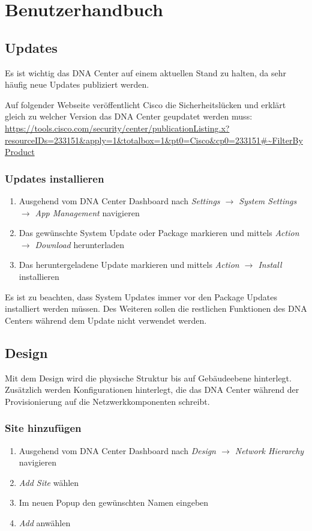 \section{Benutzerhandbuch}

\subsection{Updates}
Es ist wichtig das DNA Center auf einem aktuellen Stand zu halten, da sehr häufig neue Updates publiziert werden.

Auf folgender Webseite veröffentlicht Cisco die Sicherheitslücken und erklärt gleich zu welcher Version das DNA Center geupdatet werden muss:
\url{https://tools.cisco.com/security/center/publicationListing.x?resourceIDs=233151\&apply=1\&totalbox=1\&pt0=Cisco\&cp0=233151\#~FilterByProduct}

\subsubsection{Updates installieren}
\begin{enumerate}
	\item Ausgehend vom DNA Center Dashboard nach \textit{Settings $\rightarrow$ System Settings $\rightarrow$ App Management} navigieren
	\item Das gewünschte System Update oder Package markieren und mittels \textit{Action $\rightarrow$ Download} herunterladen
	\item Das heruntergeladene Update markieren und mittels \textit{Action $\rightarrow$ Install} installieren
\end{enumerate}

Es ist zu beachten, dass System Updates immer vor den Package Updates installiert werden müssen. Des Weiteren sollen die restlichen Funktionen des DNA Centers während dem Update nicht verwendet werden.

\subsection{Design}
Mit dem Design wird die physische Struktur bis auf Gebäudeebene hinterlegt. Zusätzlich werden Konfigurationen hinterlegt, die das DNA Center während der Provisionierung auf die Netzwerkkomponenten schreibt.

\subsubsection{Site hinzufügen}
\begin{enumerate}
	\item Ausgehend vom DNA Center Dashboard nach \textit{Design $\rightarrow$ Network Hierarchy} navigieren
	\item \textit{Add Site} wählen
	\item Im neuen Popup den gewünschten Namen eingeben
	\item \textit{Add} anwählen
\end{enumerate}

